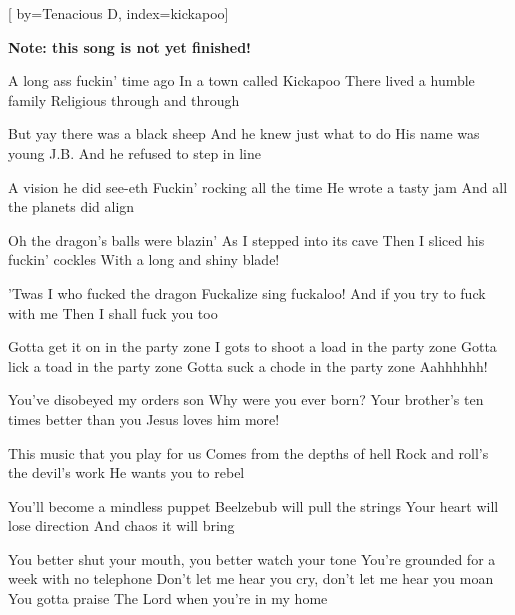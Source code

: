 
[%
    by={Tenacious D},
    index={kickapoo}]


    \label{kickapoo}

    \textbf{Note: this song is not yet finished!}

    \beginverse\memorize[verse]
        A long ass fuckin' time ago
        In a town called Kickapoo
        There lived a humble family
        Religious through and through

        But yay there was a black sheep
        And he knew just what to do
        His name was young J.B.
        And he refused to step in line

        A vision he did see-eth
        Fuckin' rocking all the time
        He wrote a tasty jam
        And all the planets did align
    \endverse

    \beginverse\replay[verse]
        Oh the dragon's balls were blazin'
        As I stepped into its cave
        Then I sliced his fuckin' cockles
        With a long and shiny blade!

        'Twas I who fucked the dragon
        Fuckalize sing fuckaloo!
        And if you try to fuck with me
        Then I shall fuck you too

        Gotta get it on in the party zone
        I gots to shoot a load in the party zone
        Gotta lick a toad in the party zone
        Gotta suck a chode in the party zone
        Aahhhhhh!
    \endverse

    \beginverse\replay[verse]
        You've disobeyed my orders son
        Why were you ever born?
        Your brother's ten times better than you
        Jesus loves him more!

        This music that you play for us
        Comes from the depths of hell
        Rock and roll's the devil's work
        He wants you to rebel

        You'll become a mindless puppet
        Beelzebub will pull the strings
        Your heart will lose direction
        And chaos it will bring

        You better shut your mouth, you better watch your tone
        You're grounded for a week with no telephone
        Don't let me hear you cry, don't let me hear you moan
        You gotta praise The Lord when you're in my home
    \endverse

